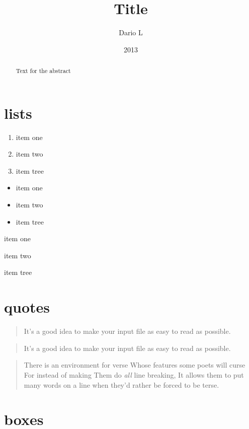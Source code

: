 \documentclass[10pt,a4paper,twocolumn]{article}
\title{Title}
\author{Dario L}
\date{2013}
\begin{document}
\maketitle
\begin{abstract}
Text for the abstract
\end{abstract}
\section{lists}
\begin{enumerate}
\renewcommand\theenumi{\alph{enumi}}
\item item one
\item item two
\item item tree
\end{enumerate}

\begin{itemize}
\item item one
\item item two
\item item tree
\end{itemize}

\begin{description}
\item[purpose] item one
\item[example] item two
\item item tree
\end{description}

\section{quotes}
\begin{quote}
It’s a good idea to make your input
file as easy to read as possible.
\end{quote}
\begin{quotation}
It’s a good idea to make your input
file as easy to read as possible.
\end{quotation}
\begin{verse}
There is an environment for verse
Whose features some poets will curse
For instead of making
Them do \emph{all} line breaking,
It allows them to put many words on a line when they’d rather be
forced to be terse.
\end{verse}

\section{boxes}
 \par
{}
\end{document}
